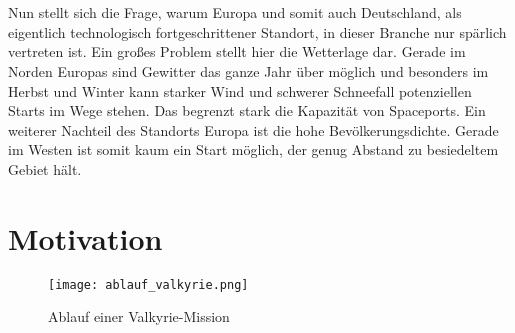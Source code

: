 \\~\\
Nun stellt sich die Frage, warum Europa und somit auch Deutschland, als eigentlich technologisch fortgeschrittener Standort, in dieser Branche nur spärlich vertreten ist. Ein großes Problem stellt hier die Wetterlage dar. Gerade im Norden Europas sind Gewitter das ganze Jahr über möglich und besonders im Herbst und Winter kann starker Wind und schwerer Schneefall potenziellen Starts im Wege stehen. Das begrenzt stark die Kapazität von Spaceports. Ein weiterer Nachteil des Standorts Europa ist die hohe Bevölkerungsdichte. Gerade im Westen ist somit kaum ein Start möglich, der genug Abstand zu besiedeltem Gebiet hält.

\section{Motivation}
\begin{figure}[h]
	\centering
	\texttt{[image: ablauf\_valkyrie.png]}
	\caption{Ablauf einer Valkyrie-Mission \cite{flugbahnBarz}}
\end{figure}

